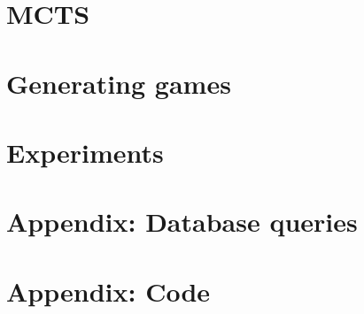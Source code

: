 \documentclass[12pt]{article}
\begin{document}
\section{MCTS}
\label{sec:mcts}


\section{Generating games}
\label{sec:generating_games}


\section{Experiments}
\label{sec:experiments}


\section{Appendix: Database queries}
\label{sec:database_queries}


\section{Appendix: Code}
\label{sec:code}


% 



\end{document}
